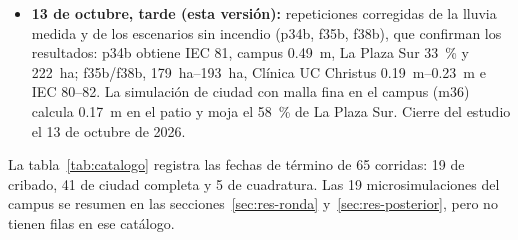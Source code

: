 \begin{itemize}
\begin{itemize}
\item severidad estimada del incendio por dNBR y respuesta de los escenarios de volumen y ciudad (f35, f38);
\item \emph{bike park} (mrbc, mrbt), obstáculo hipotético de árboles (arc, art) y porosidad por tamaño (d39);
\item corrección de la lluvia del 6 y 7 de octubre en Tobalaba;
\item detección y corrección de un artefacto numérico de masa (sección~\ref{sec:res-posterior}).
\end{itemize}
\item \textbf{13 de octubre, tarde (esta versión):} repeticiones corregidas de la lluvia medida y de los escenarios sin incendio (p34b, f35b, f38b), que confirman los resultados: p34b obtiene IEC 81, campus \SI{0,49}{m}, La Plaza Sur \SI{33}{\percent} y \SI{222}{ha}; f35b/f38b, \SIrange{179}{193}{ha}, Clínica UC Christus \SIrange{0,19}{0,23}{m} e IEC 80--82. La simulación de ciudad con malla fina en el campus (m36) calcula \SI{0,17}{m} en el patio y moja el \SI{58}{\percent} de La Plaza Sur. Cierre del estudio el 13 de octubre de 2026.
\end{itemize}
La tabla~\ref{tab:catalogo} registra las fechas de término de 65 corridas: 19 de cribado, 41 de ciudad completa y 5 de cuadratura. Las 19 microsimulaciones del campus se resumen en las secciones~\ref{sec:res-ronda} y~\ref{sec:res-posterior}, pero no tienen filas en ese catálogo.

